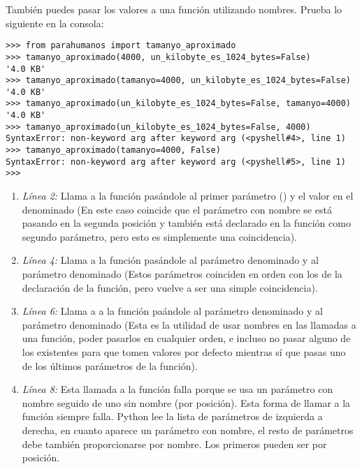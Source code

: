 También puedes pasar los valores a una función utilizando nombres. Prueba lo siguiente en la consola:

\begin{lstlisting}
>>> from parahumanos import tamanyo_aproximado
>>> tamanyo_aproximado(4000, un_kilobyte_es_1024_bytes=False)
'4.0 KB'
>>> tamanyo_aproximado(tamanyo=4000, un_kilobyte_es_1024_bytes=False)
'4.0 KB'
>>> tamanyo_aproximado(un_kilobyte_es_1024_bytes=False, tamanyo=4000)
'4.0 KB'
>>> tamanyo_aproximado(un_kilobyte_es_1024_bytes=False, 4000)
SyntaxError: non-keyword arg after keyword arg (<pyshell#4>, line 1)
>>> tamanyo_aproximado(tamanyo=4000, False)
SyntaxError: non-keyword arg after keyword arg (<pyshell#5>, line 1)
>>> 
\end{lstlisting}

\begin{enumerate}
\item \emph{Línea 2:} Llama a la función  pasándole  al primer parámetro () y el valor  en el denominado  (En este caso coincide que el parámetro con nombre se está pasando en la segunda posición y también está declarado en la función como segundo parámetro, pero esto es simplemente una coincidencia).

\item \emph{Línea 4:} Llama a la función  pasándole  al parámetro denominado  y  al parámetro denominado  (Estos parámetros coinciden en orden con los de la declaración de la función, pero vuelve a ser una simple coincidencia).

\item \emph{Línea 6:} Llama a a la función  paándole  al parámetro denominado  y  al parámetro denominado  (Esta es la utilidad de usar nombres en las llamadas a una función, poder pasarlos en cualquier orden, e incluso no pasar alguno de los existentes para que tomen valores por defecto mientras sí que pasas uno de los últimos parámetros de la función).

\item \emph{Línea 8:} Esta llamada a la función falla porque se usa un parámetro con nombre seguido de uno sin nombre (por posición). Esta forma de llamar a la función siempre falla. Python lee la lista de parámetros de izquierda a derecha, en cuanto aparece un parámetro con nombre, el resto de parámetros debe también proporcionarse por nombre. Los primeros pueden ser por posición.


\end{enumerate}
